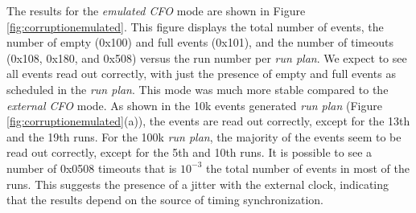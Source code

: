 The results for the \textit{emulated CFO} mode are shown in Figure 
\ref{fig:corruptionemulated}. This figure displays the total number of events, 
the number of empty (0x100) and full events (0x101), and the number of timeouts 
(0x108, 0x180, and 0x508) versus the run number per \textit{run plan}. We expect 
to see all events read out correctly, with just the presence of empty and full events 
as scheduled in the \textit{run plan}. This mode was much more stable compared to the 
\textit{external CFO} mode. As shown in the 10k events generated \textit{run plan} (Figure \ref{fig:corruptionemulated}(a)), 
the events are read out correctly, except for the 13th and the 19th runs. 
For the 100k \textit{run plan}, the majority of the events seem to be read out correctly, 
except for the 5th and 10th runs. It is possible to see a number of 0x0508 timeouts that is 
$10^{-3}$ the total number of events in most of the runs. This suggests the presence of a 
jitter with the external clock, indicating that the results depend on the source of timing synchronization.


